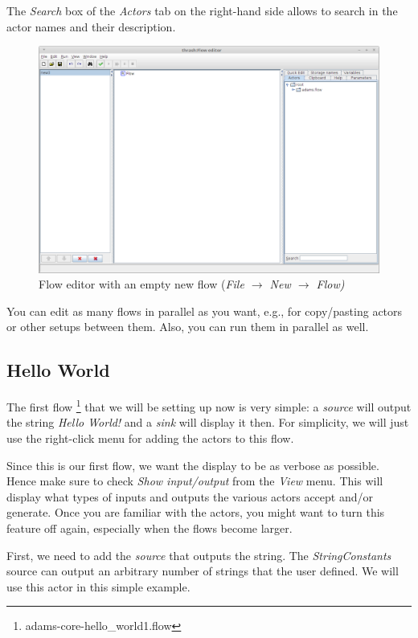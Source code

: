 The \textit{Search} box of the \textit{Actors} tab on the right-hand side allows
to search in the actor names and their description.

\begin{figure}[htb]
  \centering
  \includegraphics[width=12.0cm]{images/floweditor-new.png}
  \caption{Flow editor with an empty new flow
  (\textit{File $\rightarrow$ New $\rightarrow$ Flow)}}
  \label{floweditor-newflow}
\end{figure}

You can edit as many flows in parallel as you want, e.g., for copy/pasting
actors or other setups between them. Also, you can run them in parallel as well.

\clearpage
\subsection{Hello World}
The first flow \footnote{adams-core-hello\_world1.flow} that we will be setting
up now is very simple: a \textit{source} will output the string \textit{Hello World!} and a \textit{sink} will display
it then. For simplicity, we will just use the right-click menu for adding the
actors to this flow.

Since this is our first flow, we want the display to be as
verbose as possible. Hence make sure to check \textit{Show input/output} from
the \textit{View} menu. This will display what types of inputs and outputs the
various actors accept and/or generate. Once you are familiar with the actors,
you might want to turn this feature off again, especially when the flows become
larger.

First, we need to add the \textit{source} that outputs the string. The
\textit{StringConstants} source can output an arbitrary number of strings that
the user defined. We will use this actor in this simple example.


